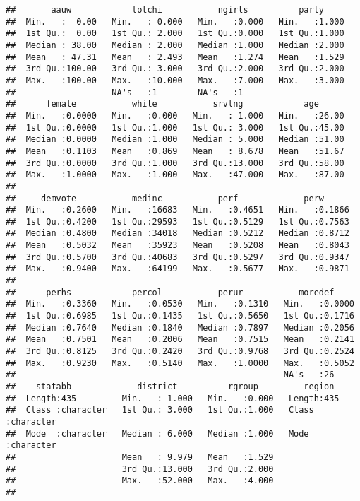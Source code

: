 \documentclass[
]{article}
\begin{document}
\begin{verbatim}
##       aauw            totchi           ngirls          party      
##  Min.   :  0.00   Min.   : 0.000   Min.   :0.000   Min.   :1.000  
##  1st Qu.:  0.00   1st Qu.: 2.000   1st Qu.:0.000   1st Qu.:1.000  
##  Median : 38.00   Median : 2.000   Median :1.000   Median :2.000  
##  Mean   : 47.31   Mean   : 2.493   Mean   :1.274   Mean   :1.529  
##  3rd Qu.:100.00   3rd Qu.: 3.000   3rd Qu.:2.000   3rd Qu.:2.000  
##  Max.   :100.00   Max.   :10.000   Max.   :7.000   Max.   :3.000  
##                   NA's   :1        NA's   :1                      
##      female           white           srvlng            age       
##  Min.   :0.0000   Min.   :0.000   Min.   : 1.000   Min.   :26.00  
##  1st Qu.:0.0000   1st Qu.:1.000   1st Qu.: 3.000   1st Qu.:45.00  
##  Median :0.0000   Median :1.000   Median : 5.000   Median :51.00  
##  Mean   :0.1103   Mean   :0.869   Mean   : 8.678   Mean   :51.67  
##  3rd Qu.:0.0000   3rd Qu.:1.000   3rd Qu.:13.000   3rd Qu.:58.00  
##  Max.   :1.0000   Max.   :1.000   Max.   :47.000   Max.   :87.00  
##                                                                   
##     demvote           medinc           perf             perw       
##  Min.   :0.2600   Min.   :16683   Min.   :0.4651   Min.   :0.1866  
##  1st Qu.:0.4200   1st Qu.:29593   1st Qu.:0.5129   1st Qu.:0.7563  
##  Median :0.4800   Median :34018   Median :0.5212   Median :0.8712  
##  Mean   :0.5032   Mean   :35923   Mean   :0.5208   Mean   :0.8043  
##  3rd Qu.:0.5700   3rd Qu.:40683   3rd Qu.:0.5297   3rd Qu.:0.9347  
##  Max.   :0.9400   Max.   :64199   Max.   :0.5677   Max.   :0.9871  
##                                                                    
##      perhs            percol           perur           moredef      
##  Min.   :0.3360   Min.   :0.0530   Min.   :0.1310   Min.   :0.0000  
##  1st Qu.:0.6985   1st Qu.:0.1435   1st Qu.:0.5650   1st Qu.:0.1716  
##  Median :0.7640   Median :0.1840   Median :0.7897   Median :0.2056  
##  Mean   :0.7501   Mean   :0.2006   Mean   :0.7515   Mean   :0.2141  
##  3rd Qu.:0.8125   3rd Qu.:0.2420   3rd Qu.:0.9768   3rd Qu.:0.2524  
##  Max.   :0.9230   Max.   :0.5140   Max.   :1.0000   Max.   :0.5052  
##                                                     NA's   :26      
##    statabb             district          rgroup         region         
##  Length:435         Min.   : 1.000   Min.   :0.000   Length:435        
##  Class :character   1st Qu.: 3.000   1st Qu.:1.000   Class :character  
##  Mode  :character   Median : 6.000   Median :1.000   Mode  :character  
##                     Mean   : 9.979   Mean   :1.529                     
##                     3rd Qu.:13.000   3rd Qu.:2.000                     
##                     Max.   :52.000   Max.   :4.000                     
## 
\end{verbatim}
\end{document}
